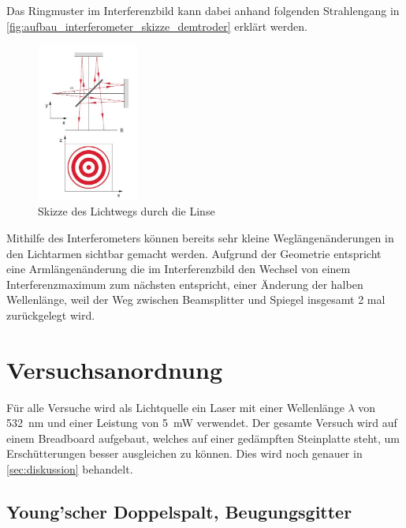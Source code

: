 \documentclass[12pt,english,ngerman]{scrartcl}
\begin{document}
Das Ringmuster im Interferenzbild kann dabei anhand folgenden Strahlengang in \autoref{fig:aufbau_interferometer_skizze_demtroder}
erklärt werden.\cite{unterlagen}

\begin{figure}[H]
	\begin{center}
		\includegraphics[width =0.3\textwidth]{./figures/linse_demtroder.jpg}
	\end{center}
	\caption[Skizze des Lichtwegs durch die Linse] 
  {Skizze des Lichtwegs durch die Linse \cite{demtroder2}
	}\label{fig:aufbau_interferometer_skizze_demtroder}
\end{figure}

Mithilfe des Interferometers können bereits sehr kleine Weglängenänderungen in den Lichtarmen sichtbar gemacht werden.
Aufgrund der Geometrie entspricht eine Armlängenänderung die im Interferenzbild den Wechsel von einem Interferenzmaximum
zum nächsten entspricht, einer Änderung der halben Wellenlänge, weil der Weg zwischen Beamsplitter und Spiegel insgesamt 
2 mal zurückgelegt wird.

\section{Versuchsanordnung}\label{sec:versuchsanordnung}

Für alle Versuche wird als Lichtquelle ein Laser mit einer Wellenlänge $\lambda$ von \SI{532}{\nano\meter} und einer 
Leistung von \SI{5}{\milli\watt} verwendet. Der gesamte Versuch wird auf einem Breadboard aufgebaut, welches auf einer 
gedämpften Steinplatte steht, um Erschütterungen besser ausgleichen zu können. Dies wird noch genauer in \autoref{sec:diskussion}
behandelt.
\subsection{Young'scher Doppelspalt, Beugungsgitter}
\end{document}
